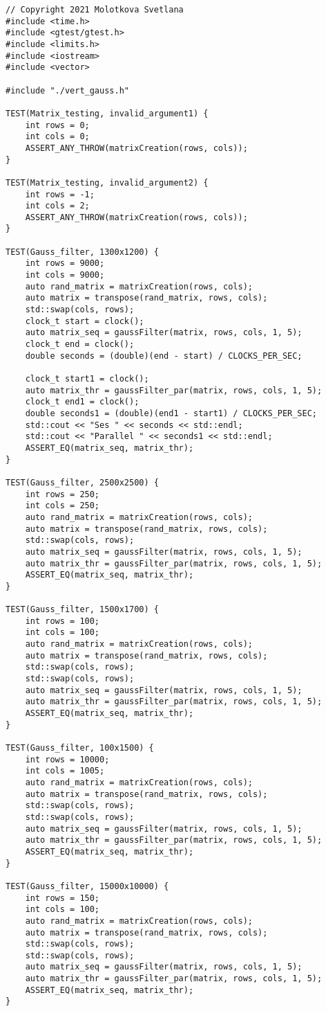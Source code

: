 \documentclass{report}
\begin{document}
\begin{lstlisting}
// Copyright 2021 Molotkova Svetlana
#include <time.h>
#include <gtest/gtest.h>
#include <limits.h>
#include <iostream>
#include <vector>

#include "./vert_gauss.h"

TEST(Matrix_testing, invalid_argument1) {
	int rows = 0;
	int cols = 0;
	ASSERT_ANY_THROW(matrixCreation(rows, cols));
}

TEST(Matrix_testing, invalid_argument2) {
	int rows = -1;
	int cols = 2;
	ASSERT_ANY_THROW(matrixCreation(rows, cols));
}

TEST(Gauss_filter, 1300x1200) {
	int rows = 9000;
	int cols = 9000;
	auto rand_matrix = matrixCreation(rows, cols);
	auto matrix = transpose(rand_matrix, rows, cols);
	std::swap(cols, rows);
	clock_t start = clock();
	auto matrix_seq = gaussFilter(matrix, rows, cols, 1, 5);
	clock_t end = clock();
	double seconds = (double)(end - start) / CLOCKS_PER_SEC;
	
	clock_t start1 = clock();
	auto matrix_thr = gaussFilter_par(matrix, rows, cols, 1, 5);
	clock_t end1 = clock();
	double seconds1 = (double)(end1 - start1) / CLOCKS_PER_SEC;
	std::cout << "Ses " << seconds << std::endl;
	std::cout << "Parallel " << seconds1 << std::endl;
	ASSERT_EQ(matrix_seq, matrix_thr);
}

TEST(Gauss_filter, 2500x2500) {
	int rows = 250;
	int cols = 250;
	auto rand_matrix = matrixCreation(rows, cols);
	auto matrix = transpose(rand_matrix, rows, cols);
	std::swap(cols, rows);
	auto matrix_seq = gaussFilter(matrix, rows, cols, 1, 5);
	auto matrix_thr = gaussFilter_par(matrix, rows, cols, 1, 5);
	ASSERT_EQ(matrix_seq, matrix_thr);
}

TEST(Gauss_filter, 1500x1700) {
	int rows = 100;
	int cols = 100;
	auto rand_matrix = matrixCreation(rows, cols);
	auto matrix = transpose(rand_matrix, rows, cols);
	std::swap(cols, rows);
	std::swap(cols, rows);
	auto matrix_seq = gaussFilter(matrix, rows, cols, 1, 5);
	auto matrix_thr = gaussFilter_par(matrix, rows, cols, 1, 5);
	ASSERT_EQ(matrix_seq, matrix_thr);
}

TEST(Gauss_filter, 100x1500) {
	int rows = 10000;
	int cols = 1005;
	auto rand_matrix = matrixCreation(rows, cols);
	auto matrix = transpose(rand_matrix, rows, cols);
	std::swap(cols, rows);
	std::swap(cols, rows);
	auto matrix_seq = gaussFilter(matrix, rows, cols, 1, 5);
	auto matrix_thr = gaussFilter_par(matrix, rows, cols, 1, 5);
	ASSERT_EQ(matrix_seq, matrix_thr);
}

TEST(Gauss_filter, 15000x10000) {
	int rows = 150;
	int cols = 100;
	auto rand_matrix = matrixCreation(rows, cols);
	auto matrix = transpose(rand_matrix, rows, cols);
	std::swap(cols, rows);
	std::swap(cols, rows);
	auto matrix_seq = gaussFilter(matrix, rows, cols, 1, 5);
	auto matrix_thr = gaussFilter_par(matrix, rows, cols, 1, 5);
	ASSERT_EQ(matrix_seq, matrix_thr);
}

\end{lstlisting}
\end{document}
